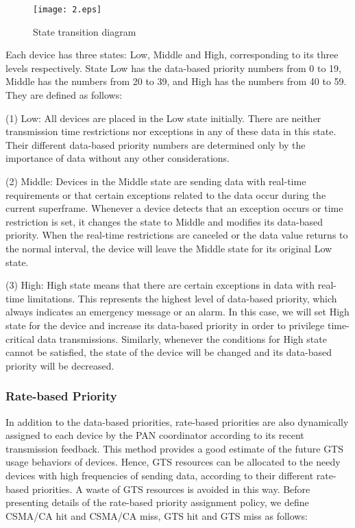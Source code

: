 \documentclass[letterpaper]{sig-alternate-10pt}
\begin{document}
\begin{figure}[!t]
\setlength{\abovecaptionskip}{1pt}
\setlength{\belowcaptionskip}{5pt}
\renewcommand{\captionfont}{\bfseries}
\centering
\texttt{[image: 2.eps]}
\centering
\caption{State transition diagram}
\label{fig_sim}
\end{figure}

Each device has three states: Low, Middle and High, corresponding to its three levels respectively. State Low has the data-based priority numbers from 0 to 19, Middle has the numbers from 20 to 39, and High has the numbers from 40 to 59. They are defined as follows:

(1)	Low: All devices are placed in the Low state initially. There are neither transmission time restrictions nor exceptions in any of these data in this state. Their different data-based priority numbers are determined only by the importance of data without any other considerations.

(2)	Middle: Devices in the Middle state are sending data with real-time requirements or that certain exceptions related to the data occur during the current superframe. Whenever a device detects that an exception occurs or time restriction is set, it changes the state to Middle and modifies its data-based priority. When the real-time restrictions are canceled or the data value returns to the normal interval, the device will leave the Middle state for its original Low state.

(3)	High: High state means that there are certain exceptions in data with real-time limitations. This represents the highest level of data-based priority, which always indicates an emergency message or an alarm. In this case, we will set High state for the device and increase its data-based priority in order to privilege time-critical data transmissions. Similarly, whenever the conditions for High state cannot be satisfied, the state of the device will be changed and its data-based priority will be decreased.

\subsubsection{Rate-based Priority}
In addition to the data-based priorities, rate-based priorities are also dynamically assigned to each device by the PAN coordinator according to its recent transmission feedback. This method provides a good estimate of the future GTS usage behaviors of devices. Hence, GTS resources can be allocated to the needy devices with high frequencies of sending data, according to their different rate-based priorities. A waste of GTS resources is avoided in this way. Before presenting details of the rate-based priority assignment policy, we define CSMA/CA hit and CSMA/CA miss, GTS hit and GTS miss as follows:
\end{document}
